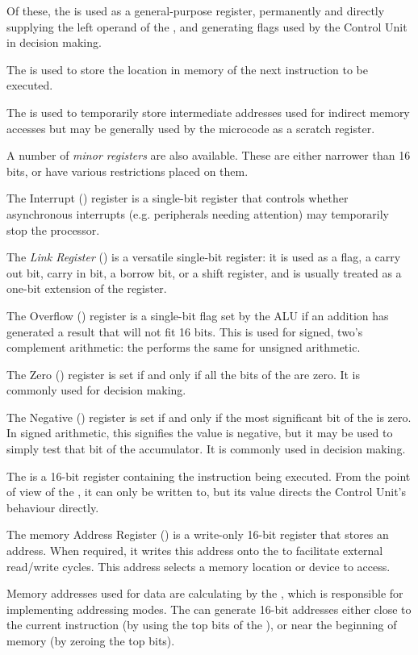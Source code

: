 Of these, the \A{} is used as a general-purpose register, permanently and
directly supplying the left operand of the \ALU, and generating flags used by
the Control Unit in decision making.

The \PC{} is used to store the location in memory of the next instruction to be
executed.

The \DR{} is used to temporarily store intermediate addresses used for indirect
memory accesses but may be generally used by the microcode as a scratch
register.

A number of {\em minor registers} are also available. These are either narrower
than 16 bits, or have various restrictions placed on them.

The Interrupt (\Ireg{}) register is a single-bit register that controls whether
asynchronous interrupts (e.g. peripherals needing attention) may temporarily
stop the processor.

The {\em Link Register} (\Lreg) is a versatile single-bit register: it is used
as a flag, a carry out bit, carry in bit, a borrow bit, or a shift register,
and is usually treated as a one-bit extension of the \A{} register.

The Overflow (\Vreg{}) register is a single-bit flag set by the ALU if an
addition has generated a result that will not fit 16 bits. This is used for
signed, two's complement arithmetic: the \Lreg performs the same for unsigned
arithmetic.

The Zero (\Zreg{}) register is set if and only if all the bits of the \AC{} are
zero. It is commonly used for decision making.

The Negative (\Nreg{}) register is set if and only if the most significant bit
of the \AC{} is zero. In signed arithmetic, this signifies the value is
negative, but it may be used to simply test that bit of the accumulator. It is
commonly used in decision making.

The \IR{} is a 16-bit register containing the instruction being executed. From
the point of view of the \IBUS{}, it can only be written to, but its value
directs the Control Unit's behaviour directly.

The memory Address Register (\AR{}) is a write-only 16-bit register that stores
an address. When required, it writes this address onto the \ABUS{} to
facilitate external read/write cycles. This address selects a memory location
or device to access.

Memory addresses used for data are calculating by the \AGL{}, which is
responsible for implementing addressing modes. The \AGL{} can generate 16-bit
addresses either close to the current instruction (by using the top bits of the
\PC{}), or near the beginning of memory (by zeroing the top bits).

